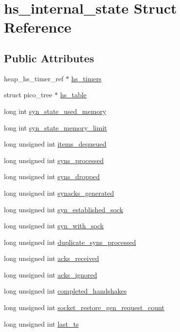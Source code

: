 \hypertarget{strucths__internal__state}{\section{hs\-\_\-internal\-\_\-state Struct Reference}
\label{strucths__internal__state}
}
\subsection*{Public Attributes}
\begin{DoxyCompactItemize}
\item 
heap\-\_\-hs\-\_\-timer\-\_\-ref $\ast$ \hyperlink{strucths__internal__state_a5d19061d7acad7124266f81bf5c7d98f}{hs\-\_\-timers}
\item 
struct pico\-\_\-tree $\ast$ \hyperlink{strucths__internal__state_a32b57cb261d476ccc282be6f7f3b3398}{hs\-\_\-table}
\item 
long int \hyperlink{strucths__internal__state_a422634ae83899c2dca101dbb187d61bd}{syn\-\_\-state\-\_\-used\-\_\-memory}
\item 
long int \hyperlink{strucths__internal__state_a76e2d5d1ad49e970f4249d983aaabd64}{syn\-\_\-state\-\_\-memory\-\_\-limit}
\item 
long unsigned int \hyperlink{strucths__internal__state_a132da1299f254af535dd04d50593d21e}{items\-\_\-dequeued}
\item 
long unsigned int \hyperlink{strucths__internal__state_a6e2c225d20dcaaea11c634daf95fbe77}{syns\-\_\-processed}
\item 
long unsigned int \hyperlink{strucths__internal__state_ac1f543be2d395d301b51911280e8d15f}{syns\-\_\-dropped}
\item 
long unsigned int \hyperlink{strucths__internal__state_a938f26b68569515e10c979fedeffd900}{synacks\-\_\-generated}
\item 
long unsigned int \hyperlink{strucths__internal__state_a26b6501ff36adb3fe095afff480a8f95}{syn\-\_\-established\-\_\-sock}
\item 
long unsigned int \hyperlink{strucths__internal__state_afc7c3c0bc8530436594739f8f68dcdfa}{syn\-\_\-with\-\_\-sock}
\item 
long unsigned int \hyperlink{strucths__internal__state_a5c57148dddb7fbe07b770f7b28e03377}{duplicate\-\_\-syns\-\_\-processed}
\item 
long unsigned int \hyperlink{strucths__internal__state_a894f19005fc57a38515718b01e1f16d6}{acks\-\_\-received}
\item 
long unsigned int \hyperlink{strucths__internal__state_a3a25f96509f9745e82485dc5157cce76}{acks\-\_\-ignored}
\item 
long unsigned int \hyperlink{strucths__internal__state_a2bb7bdfb44554fc23bdac6abd910dee5}{completed\-\_\-handshakes}
\item 
long unsigned int \hyperlink{strucths__internal__state_ad339b73bc97babd709fb0e9074b25f33}{socket\-\_\-restore\-\_\-gen\-\_\-request\-\_\-count}
\item 
long unsigned int \hyperlink{strucths__internal__state_ab18dbb54849487fe27896e6064e15a8a}{last\-\_\-ts}
\end{DoxyCompactItemize}


